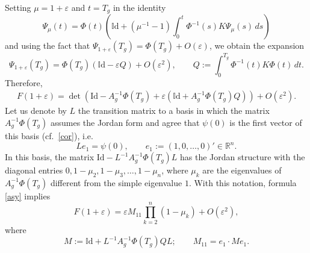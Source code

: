 \documentclass{article}
\let\epsilon\varepsilon
\let\varepsilon\epsilon
\begin{document}
Setting $\mu=1+\varepsilon$ and $t=T_g$ in the identity
$$
\Psi_\mu(t)= \Phi(t)\left(\mathbb{I}\text{d} + (\mu^{-1}-1)\int_{0}^{t}  \Phi^{-1}(s)K \Psi_\mu(s)\,ds\right)
$$
and
using the fact that $\Psi_{1+\epsilon}(T_g)=\Phi(T_g)+O(\varepsilon)$, we obtain the expansion
\[
\Psi_{1+\epsilon}(T_g)=\Phi(T_g)\left(\mathbb{I}\text{d} - \varepsilon Q\right)+O(\varepsilon^2), \qquad Q:=\int_{0}^{T_g}  \Phi^{-1}(t)K \Phi(t)\,dt.
\]
Therefore,
\begin{equation}\label{asy}
\begin{array}{rcl}
F(1+\epsilon) %
=%
\det\left(  \text{Id}-A_g^{-1}\Phi(T_g) +\varepsilon \left(\mathbb{I}\text{d} + A_g^{-1}\Phi(T_g) Q\right)\right)+O(\varepsilon^2).
\end{array}
\end{equation}
Let us denote by $L$ the transition matrix to a basis
in which the matrix $A_g^{-1}\Phi(T_g)$ assumes the Jordan form
and agree that $\psi(0)$ is the first vector of this basis (cf.~\eqref{cor}), i.e.
\begin{equation}\label{ps}
L e_1=\psi(0),\qquad e_1:=(1,0,\ldots,0)'\in\mathbb{R}^n.
\end{equation}
In this basis, the matrix $\text{Id}-L^{-1}A_g^{-1}\Phi(T_g)L$ has the Jordan structure 
with the diagonal entries $0, 1-\mu_2,1-\mu_3,\ldots,1-\mu_n$, where $\mu_k$ are the eigenvalues of $A_g^{-1}\Phi(T_g)$ different from the simple eigenvalue $1$.
With this notation, formula \eqref{asy} implies 
\begin{equation}\label{FF}
F(1+\epsilon)=\varepsilon M_{11} \prod^{n}_{k=2}(1-\mu_k)+O(\varepsilon^2),
\end{equation}
where
\begin{equation}\label{M}
M:=\mathbb{I}\text{d} + L^{-1} A_g^{-1}\Phi(T_g) Q L; \qquad M_{11}=e_1 \cdot Me_1. %
\end{equation}
\end{document}
